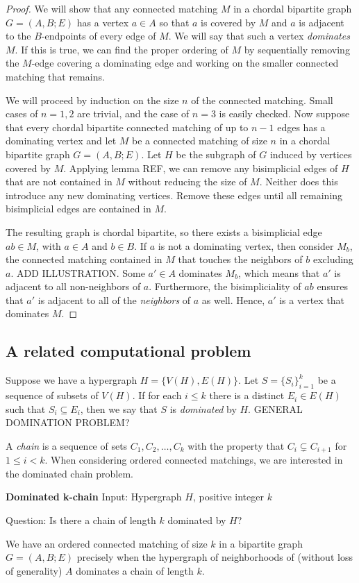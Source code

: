 \begin{proof}
%
We will show that any connected matching $M$ in a chordal bipartite graph $G = (A,B; E)$ has a vertex $a \in A$ so that $a$ is covered by $M$ and $a$ is adjacent to the $B$-endpoints of every edge of $M$.  
%
We will say that such a vertex {\it dominates} $M$.  
%
If this is true, we can find the proper ordering of $M$ by sequentially removing the $M$-edge covering a dominating edge and working on the smaller connected matching that remains.

We will proceed by induction on the size $n$ of the connected matching.  
%
Small cases of $n = 1,2$ are trivial, and the case of $n=3$ is easily checked.  
%
Now suppose that every chordal bipartite connected matching of up to $n-1$ edges has a dominating vertex and let $M$ be a connected matching of size $n$ in a chordal bipartite graph $G = (A,B;E)$.  
%
Let $H$ be the subgraph of $G$ induced by vertices covered by $M$.
%
Applying lemma REF, we can remove any bisimplicial edges of $H$ that are not contained in $M$ without reducing the size of $M$.  
%
Neither does this introduce any new dominating vertices.  
%
Remove these edges until all remaining bisimplicial edges are contained in $M$.  

The resulting graph is chordal bipartite, so there exists a bisimplicial edge $ab \in M$, with $a \in A$ and $b \in B$.  
%
If $a$ is not a dominating vertex, then consider $M_b$, the connected matching contained in $M$ that touches the neighbors of $b$ excluding $a$.  
%
ADD ILLUSTRATION.  
%
Some $a' \in A$ dominates $M_b$, which means that $a'$ is adjacent to all non-neighbors of $a$.  
%
Furthermore, the bisimpliciality of $ab$ ensures that $a'$ is adjacent to all of the {\it neighbors} of $a$ as well.  
%
 Hence, $a'$ is a vertex that dominates $M$.  
\end{proof} 

\subsection{A related computational problem}

Suppose we have a hypergraph $H = \{V(H), E(H)\}$.  Let $S = \{S_i\}_{i=1}^k$ be a sequence of subsets of $V(H)$. If for each $i \leq k$ there is a distinct $E_i \in E(H)$ such that $S_i \subseteq E_i$, then we say that $S$ is {\it dominated} by $H$.  GENERAL DOMINATION PROBLEM?  

A {\it chain} is a sequence of sets $C_1, C_2, \ldots, C_k$ with the property that $C_i \subsetneq C_{i+1}$ for $1 \leq i <k$.  When considering ordered connected matchings, we are interested in the dominated chain problem.
%
\begin{framed}\noindent\textbf{Dominated k-chain}
	\vskip 0.5cm
	\noindent Input: Hypergraph $H$, positive integer $k$
	
	\noindent Question: Is there a chain of length $k$ dominated by $H$?
\end{framed}
We have an ordered connected matching of size $k$ in a bipartite graph $G = (A,B;E)$ precisely when the hypergraph of neighborhoods of (without loss of generality) $A$ dominates a chain of length $k$. 

